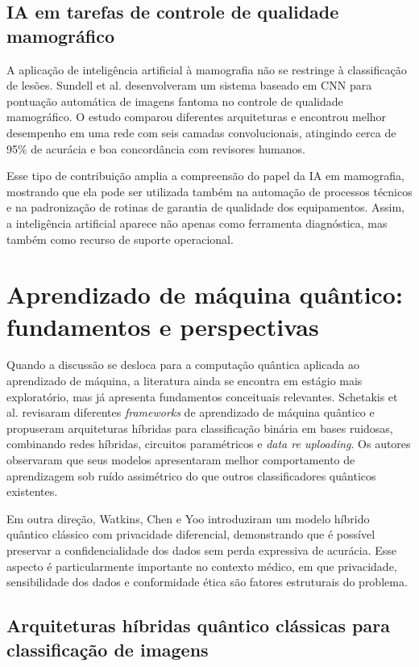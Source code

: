 \documentclass[
    12pt,
    openright,
    oneside,
    a4paper,
    english,
    brazil
]{abntex2}
\begin{document}
\subsection{IA em tarefas de controle de qualidade mamográfico}

A aplicação de inteligência artificial à mamografia não se restringe à classificação de lesões. Sundell et al. \cite{sundell2022} desenvolveram um sistema baseado em CNN para pontuação automática de imagens fantoma no controle de qualidade mamográfico. O estudo comparou diferentes arquiteturas e encontrou melhor desempenho em uma rede com seis camadas convolucionais, atingindo cerca de 95\% de acurácia e boa concordância com revisores humanos.

Esse tipo de contribuição amplia a compreensão do papel da IA em mamografia, mostrando que ela pode ser utilizada também na automação de processos técnicos e na padronização de rotinas de garantia de qualidade dos equipamentos. Assim, a inteligência artificial aparece não apenas como ferramenta diagnóstica, mas também como recurso de suporte operacional.

\section{Aprendizado de máquina quântico: fundamentos e perspectivas}

Quando a discussão se desloca para a computação quântica aplicada ao aprendizado de máquina, a literatura ainda se encontra em estágio mais exploratório, mas já apresenta fundamentos conceituais relevantes. Schetakis et al. \cite{schetakis2022} revisaram diferentes \textit{frameworks} de aprendizado de máquina quântico e propuseram arquiteturas híbridas para classificação binária em bases ruidosas, combinando redes híbridas, circuitos paramétricos e \textit{data re uploading}. Os autores observaram que seus modelos apresentaram melhor comportamento de aprendizagem sob ruído assimétrico do que outros classificadores quânticos existentes.

Em outra direção, Watkins, Chen e Yoo \cite{watkins2023} introduziram um modelo híbrido quântico clássico com privacidade diferencial, demonstrando que é possível preservar a confidencialidade dos dados sem perda expressiva de acurácia. Esse aspecto é particularmente importante no contexto médico, em que privacidade, sensibilidade dos dados e conformidade ética são fatores estruturais do problema.

\subsection{Arquiteturas híbridas quântico clássicas para classificação de imagens}
\end{document}
